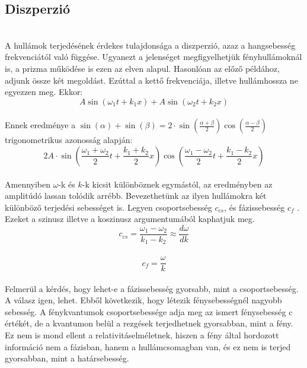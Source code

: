 \documentclass[a4paper]{article}
\begin{document}
\subsection*{Diszperzió}
\\
A hullámok terjedésének érdekes tulajdonsága a diszperzió, azaz a hangsebesség frekvenciától való függése. Ugyanezt a jelenséget megfigyelhetjük fényhullámoknál is, a prizma működése is ezen az elven alapul. Hasonlóan az előző példához, adjunk össze két megoldást. Ezúttal a kettő frekvenciája, illetve hullámhossza ne egyezzen meg. Ekkor:
\begin{equation}
A \sin(\omega_1 t + k_1x) + A \sin(\omega_2 t + k_2x)
\end{equation}
\\
Ennek eredménye a $\sin(\alpha) + \sin(\beta) = 2 \cdot \sin(\frac{\alpha+\beta}{2}) \cos(\frac{\alpha-\beta}{2})$ trigonometrikus azonosság alapján:
\\
\begin{equation}
2A \cdot \sin ( \frac{\omega_1  + \omega_2}{2}t+\frac{k_1  + k_2}{2}x ) \cos ( \frac{\omega_1 - \omega_2}{2}t+\frac{k_1  - k_2}{2}x)
\end{equation}
\\
Amennyiben $\omega$-k és $k$-k kicsit különböznek egymástól, az eredményben
az amplitúdó lassan tolódik arrébb. Bevezethetünk az ilyen hullámokra két
különböző terjedési sebességet is. Legyen csoportsebesség $c_{cs}$, és fázissebesség
$c_f$ . Ezeket a szinusz illetve a koszinusz argumentumából kaphatjuk meg.
\begin{equation}
c_{cs}=\frac{\omega_1  - \omega_2}{k_1  - k_2} \approx \frac{d \omega}{dk}
\end{equation}
\\
\begin{equation}
c_f=\frac{\omega}{k}
\end{equation}
\\
Felmerül a kérdés, hogy lehet-e a fázissebesség gyorsabb, mint a csoportsebesség. A válasz igen, lehet. Ebből következik, hogy létezik fénysebességnél nagyobb sebesség. A fénykvantumok csoportsebessége adja meg az ismert fénysebesség c értékét, de a kvantumon belül a rezgések terjedhetnek gyorsabban, mint a fény. Ez nem is mond ellent a relativitáselméletnek, hiszen a fény által hordozott információ nem a fázisban, hanem a hullámcsomagban van, és ez nem is terjed gyorsabban, mint a határsebesség.
\\
\end{document}
